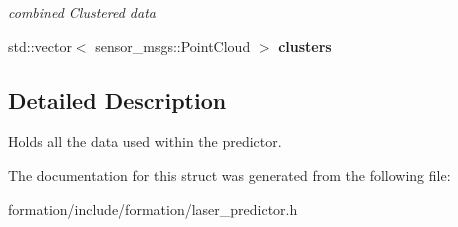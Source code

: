 \begin{DoxyCompactItemize}
\begin{DoxyCompactList}\small\item\em combined Clustered data \end{DoxyCompactList}\item 
std\+::vector$<$ sensor\+\_\+msgs\+::\+Point\+Cloud $>$ {\bfseries clusters}\hypertarget{structLaserPredictor_1_1Data_acb3ccd7db818edc244956b9fb257378e}{}\label{structLaserPredictor_1_1Data_acb3ccd7db818edc244956b9fb257378e}

\end{DoxyCompactItemize}


\subsection{Detailed Description}
Holds all the data used within the predictor. 

The documentation for this struct was generated from the following file\+:\begin{DoxyCompactItemize}
\item 
formation/include/formation/laser\+\_\+predictor.\+h\end{DoxyCompactItemize}
